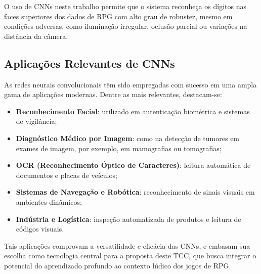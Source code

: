 O uso de CNNs neste trabalho permite que o sistema reconheça os
dígitos nas faces superiores dos dados de RPG com alto grau de
robustez, mesmo em condições adversas, como iluminação irregular,
oclusão parcial ou variações na distância da câmera.

\subsection{Aplicações Relevantes de CNNs}

As redes neurais convolucionais têm sido empregadas com sucesso
em uma ampla gama de aplicações modernas. Dentre as mais relevantes,
destacam-se:
\begin{itemize}
\item \textbf{Reconhecimento Facial}: utilizado em autenticação
biométrica e sistemas de vigilância;
\item \textbf{Diagnóstico Médico por Imagem}: como na detecção de
tumores em exames de imagem, por exemplo, em mamografias
ou tomografias;
\item \textbf{OCR (Reconhecimento Óptico de Caracteres)}:
leitura automática de documentos e placas de veículos;
\item \textbf{Sistemas de Navegação e Robótica}:
reconhecimento de sinais visuais em ambientes dinâmicos;
\item \textbf{Indústria e Logística}: inspeção automatizada de
produtos e leitura de códigos visuais.
\end{itemize}

Tais aplicações comprovam a versatilidade e eficácia das CNNs,
e embasam sua escolha como tecnologia central para a proposta deste
TCC, que busca integrar o potencial do aprendizado profundo ao
contexto lúdico dos jogos de RPG.
